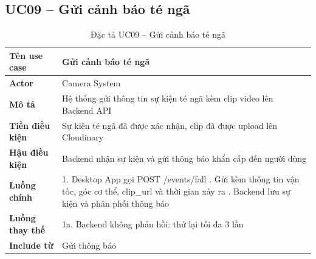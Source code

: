 \subsection*{UC09 -- Gửi cảnh báo té ngã}
\begin{table}[H]
    \captionsetup{justification=raggedright, singlelinecheck=false}
    \caption{Đặc tả UC09 -- Gửi cảnh báo té ngã}
\centering
\begin{tabular}{|p{3.5cm}|p{10cm}|}
\hline
\textbf{Tên use case} & Gửi cảnh báo té ngã \\
\hline
\textbf{Actor} & Camera System \\
\hline
\textbf{Mô tả} & Hệ thống gửi thông tin sự kiện té ngã
  kèm clip video lên Backend API \\
\hline
\textbf{Tiền điều kiện} & Sự kiện té ngã đã được xác nhận,
  clip đã được upload lên Cloudinary \\
\hline
\textbf{Hậu điều kiện} & Backend nhận sự kiện và gửi
  thông báo khẩn cấp đến người dùng \\
\hline
\textbf{Luồng chính} &
  1. Desktop App gọi POST /events/fall \newline
  2. Gửi kèm thông tin vận tốc, góc cơ thể,
     clip\_url và thời gian xảy ra \newline
  3. Backend lưu sự kiện và phân phối thông báo \\
\hline
\textbf{Luồng thay thế} &
  1a. Backend không phản hồi: thử lại tối đa
  3 lần \\
\hline
\textbf{Include từ} & Gửi thông báo \\
\hline
\end{tabular}

\end{table}

